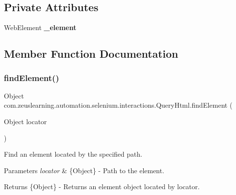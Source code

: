 \subsection*{Private Attributes}
\begin{DoxyCompactItemize}
\item 
\hypertarget{classcom_1_1zeuslearning_1_1automation_1_1selenium_1_1interactions_1_1QueryHtml_a8522e6d1b4ddc341adb3320cfcb388b3}{}\label{classcom_1_1zeuslearning_1_1automation_1_1selenium_1_1interactions_1_1QueryHtml_a8522e6d1b4ddc341adb3320cfcb388b3} 
Web\+Element {\bfseries \+\_\+element}
\end{DoxyCompactItemize}


\subsection{Member Function Documentation}
\hypertarget{classcom_1_1zeuslearning_1_1automation_1_1selenium_1_1interactions_1_1QueryHtml_a21ff6c1d862318a3e5beff87a1336a75}{}\label{classcom_1_1zeuslearning_1_1automation_1_1selenium_1_1interactions_1_1QueryHtml_a21ff6c1d862318a3e5beff87a1336a75} 
\subsubsection{\texorpdfstring{find\+Element()}{findElement()}}
{\footnotesize\ttfamily Object com.\+zeuslearning.\+automation.\+selenium.\+interactions.\+Query\+Html.\+find\+Element (\begin{DoxyParamCaption}\item[{Object}]{locator }\end{DoxyParamCaption})\hspace{0.3cm}{\ttfamily [inline]}}

Find an element located by the specified path.


\begin{DoxyParams}{Parameters}
{\em locator} & \{Object\} -\/ Path to the element. \\
\hline
\end{DoxyParams}
\begin{DoxyReturn}{Returns}
\{Object\} -\/ Returns an element object located by {\ttfamily locator}. 
\end{DoxyReturn}


